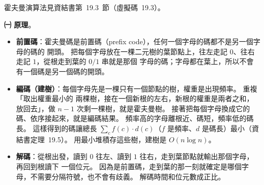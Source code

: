 \begin{pastsoln}
霍夫曼演算法見資結書第~19.3~節（虛擬碼~19.3）。

\textbf{㈠ 原理}。
\begin{itemize}
\item \textbf{前置碼}：霍夫曼碼是前置碼（prefix code），任何一個字母的碼都不是另一個字母的碼的
開頭。 把每個字母放在一棵二元樹的葉節點上，往左走記 $0$、往右走記 $1$，從根走到葉的 $0/1$ 串就是那個
字母的碼；字母都在葉上，所以不會有一個碼是另一個碼的開頭。
\item \textbf{編碼（建樹）}：每個字母先是一棵只有一個節點的樹，權重是出現頻率。 重複「取出權重最小的
兩棵樹，接在一個新根的左右，新根的權重是兩者之和，放回去」，做 $n - 1$ 次剩一棵樹，就是霍夫曼樹。
接著把每個字母換成它的碼、依序接起來，就是編碼結果。 頻率高的字母離根近、碼短，頻率低的碼長。
這樣得到的碼讓總長 $\sum_c f(c)\cdot d(c)$（$f$ 是頻率、$d$ 是碼長）最小（資結書定理~19.5）。
用最小堆積存這些樹，建樹是 $O(n \log n)$。
\item \textbf{解碼}：從根出發，讀到 $0$ 往左、讀到 $1$ 往右，走到葉節點就輸出那個字母，再回到根讀下
一個位元。 因為是前置碼，走到葉的那一刻就確定是哪個字母，不需要分隔符號，也不會有歧義。
解碼時間和位元數成正比。
\end{itemize}


\end{pastsoln}
